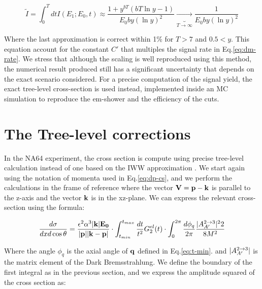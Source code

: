 \begin{equation}
  \label{eq:i-int}
  \widetilde{I} = \int^T_0 dt I(E_1; E_0, t) \approx \frac{1 + y^{bT}(bT\ln{y} - 1)}{E_0by(\ln{y})^2} \underbrace{\to}_{T \to \infty} \frac{1}{E_0by(\ln{y})^2}
\end{equation}

Where the last approximation is correct within 1\% for $T>7$ and $0.5 < y$. This equation account for the constant $C'$ that multiples the signal rate in Eq.\ref{eq:dm-rate}. We stress that although the scaling is well reproduced using this method, the numerical result produced still has a significant uncertainty that depends on the exact scenario considered. For a precise computation of the signal yield, the exact tree-level cross-section is used instead, implemented inside an MC simulation to reproduce the em-shower and the efficiency of the cuts.



\section{The Tree-level corrections}
\label{appA:sec:cross-section-tl}

In the NA64 experiment, the cross section is compute using precise tree-level calculation instead of one based on the IWW approximation \cite{DMsimulation}. We start again using the notation of momenta used in Eq.\ref{eq:dp-cs}, and we perform the calculations in the frame of reference where the vector $\bf{V} = \bf{p} - \bf{k}$ is parallel to the z-axis and the vector $\bf{k}$ is in the xz-plane. We can express the relevant cross-section using the formula:

\begin{equation}
  \label{eq:cs-tl}
  \frac{d\sigma}{dx d\cos{\theta}} = \frac{\epsilon^2 \alpha^3 |\bf{k}| E_0}{|\bf{p}| |\bf{k} - \bf{p}|} \cdot \int_{t_{min}}^{t_{max}} \frac{dt}{t^2} G^{el}_{2}(t) \cdot \int_0^{2\pi} \frac{d\phi_q}{2\pi} \frac{|A^{2 \to 3}_{A'}|^22}{8 M^2}
\end{equation}

Where the angle $\phi_q$ is the axial angle of $\bf{q}$ defined in Eq.\ref{eq:t-min}. and $|A^{2 \to 3}_{A'}|$ is the matrix element of the Dark Bremsstrahlung. We define the boundary of the first integral as in the previous section, and we express the amplitude squared of the cross section as:

